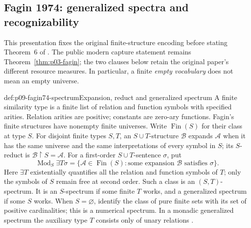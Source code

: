 
\subsection{Fagin 1974: generalized spectra and recognizability}
\label{sec:p09-n-c-004-01}

This presentation fixes the original finite-structure encoding before stating
Theorem~6 of \cite{Fagin1974}.  The public modern capture statement remains
Theorem~\ref{thm:p03-fagin}; the two clauses below retain the original paper's
different resource measures.  In particular, a finite \emph{empty vocabulary}
does not mean an empty universe.

\begin{hbdefinition}{def:p09-fagin74-spectrum}{Expansion, reduct and generalized spectrum}
A finite similarity type is a finite list of relation and function symbols
with specified arities.  Relation arities are positive; constants are
zero-ary functions.  Fagin's finite structures have nonempty finite universes.
Write \(\operatorname{Fin}(S)\) for their class at type \(S\).
For disjoint finite types \(S,T\), an \(S\cup T\)-structure
\(\mathcal B\) expands \(\mathcal A\) when it has the same universe and
the same interpretations of every symbol in \(S\); its \(S\)-reduct is
\(\mathcal B\mathbin{\upharpoonright}S=\mathcal A\).
For a first-order \(S\cup T\)-sentence \(\sigma\), put
\[
 \operatorname{Mod}_{S}\exists T\sigma
 =\{\mathcal A\in\operatorname{Fin}(S):
       \text{some expansion }\mathcal B\text{ satisfies }\sigma\}.
\]
Here \(\exists T\) existentially quantifies all the relation and function
symbols of \(T\); only the symbols of \(S\) remain free at second order.
Such a class is an \((S,T)\)-spectrum.  It is an \(S\)-spectrum if some
finite \(T\) works, and a generalized spectrum if some \(S\) works.
When \(S=\varnothing\), identify the class of pure finite sets with its set
of positive cardinalities; this is a numerical spectrum.  In a monadic
generalized spectrum the auxiliary type \(T\) consists only of unary
relations \cite[\S2, pp.~47--49]{Fagin1974}.
\end{hbdefinition}

